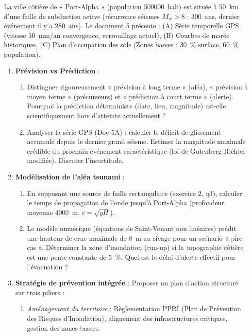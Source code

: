 \documentclass[11pt]{article}
\begin{document}
\begin{exercice}
La ville côtière de « Port-Alpha » (population \SI{500 000}{hab}) est située à \SI{50}{km} d'une faille de subduction active (récurrence séismes $M_w>8$ : \SI{300}{ans}, dernier événement il y a \SI{280}{ans}). Le document 5 présente : (A) Série temporelle GPS (vitesse \SI{30}{mm/an} convergence, verrouillage actuel), (B) Courbes de marée historiques, (C) Plan d'occupation des sols (Zones basses : \SI{30}{\%} surface, \SI{60}{\%} population).

\begin{enumerate}
\item \textbf{Prévision vs Prédiction} :
      \begin{enumerate}
      \item Distinguer rigoureusement « prévision à long terme » (aléa), « prévision à moyen terme » (précurseurs) et « prédiction à court terme » (alerte). Pourquoi la prédiction déterministe (date, lieu, magnitude) est-elle scientifiquement hors d'atteinte actuellement ?
      \item Analyser la série GPS (Doc 5A) : calculer le déficit de glissement accumulé depuis le dernier grand séisme. Estimer la magnitude maximale crédible du prochain événement caractéristique (loi de Gutenberg-Richter modifiée). Discuter l'incertitude.
      \end{enumerate}
\item \textbf{Modélisation de l'aléa tsunami} :
      \begin{enumerate}
      \item En supposant une source de faille rectangulaire (exercice 2, q3), calculer le temps de propagation de l'onde jusqu'à Port-Alpha (profondeur moyenne \SI{4000}{m}, $c = \sqrt{gH}$).
      \item Le modèle numérique (équations de Saint-Venant non linéaires) prédit une hauteur de crue maximale de \SI{8}{m} au rivage pour un scénario « pire cas ». Déterminer la zone d'inondation (run-up) si la topographie côtière est une pente constante de \SI{5}{\%}. Quel est le délai d'alerte effectif pour l'évacuation ?
      \end{enumerate}
\item \textbf{Stratégie de prévention intégrée} : Proposer un plan d'action structuré sur trois piliers :
      \begin{enumerate}
      \item \textit{Aménagement du territoire} : Règlementation PPRI (Plan de Prévention des Risques d'Inondation), alignement des infrastructures critiques, gestion des zones basses.

\end{enumerate}
\end{enumerate}
\end{exercice}
\end{document}
